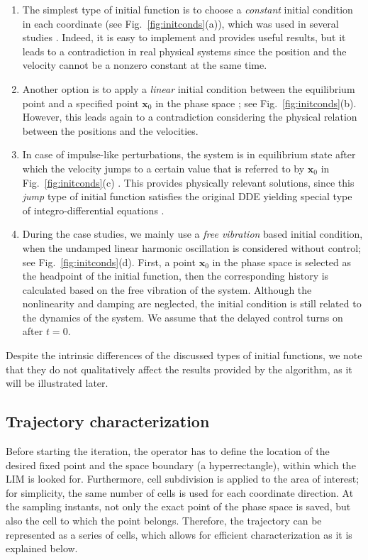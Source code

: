 \documentclass[preprint,12pt]{elsarticle}
\begin{document}
	\begin{enumerate}[label=(\alph*)]
		\item The simplest type of initial function is to choose a \textit{constant} initial condition in each coordinate (see Fig.~\ref{fig:initconds}(a)), which was used in several studies \cite{scholl2020norm,yoshida2021basins}. Indeed, it is easy to implement and provides useful results, but it leads to a contradiction in real physical systems since the position and the velocity cannot be a nonzero constant at the same time. 
		
		\item Another option is to apply a \textit{linear} initial condition between the equilibrium point and a specified point $\mathbf{x}_0$ in the phase space \cite{scholl2020norm}; see Fig.~\ref{fig:initconds}(b). However, this leads again to a contradiction considering the physical relation between the positions and the velocities.
		
		\item In case of impulse-like perturbations, the system is in equilibrium state after which the velocity jumps to a certain value that is referred to by $\mathbf{x}_0$ in Fig.~\ref{fig:initconds}(c) \cite{scholl2020norm,yoshida2021basins}. This provides physically relevant solutions, since this \textit{jump} type of initial function satisfies the original DDE yielding special type of integro-differential equations \cite{burton2005volterra,burton2016existence}.
		
		\item During the case studies, we mainly use a \textit{free vibration} based initial condition, when the undamped linear harmonic oscillation is considered without control; see Fig.~\ref{fig:initconds}(d). First, a point $\mathbf{x}_0$ in the phase space is selected as the headpoint of the initial function, then the corresponding history is calculated based on the free vibration of the system. Although the nonlinearity and damping are neglected, the initial condition is still related to the dynamics of the system. We assume that the delayed control turns on after $t=0$.
	\end{enumerate}
	
	Despite the intrinsic differences of the discussed types of initial functions, we note that they do not qualitatively affect the results provided by the algorithm, as it will be illustrated later.
	
	\subsection{Trajectory characterization}
	Before starting the iteration, the operator has to define the location of the desired fixed point and the space boundary (a hyperrectangle), within which the LIM is looked for. Furthermore, cell subdivision is applied to the area of interest; for simplicity, the same number of cells is used for each coordinate direction. At the sampling instants, not only the exact point of the phase space is saved, but also the cell to which the point belongs. Therefore, the trajectory can be represented as a series of cells, which allows for efficient characterization as it is explained below.
	
\end{document}
